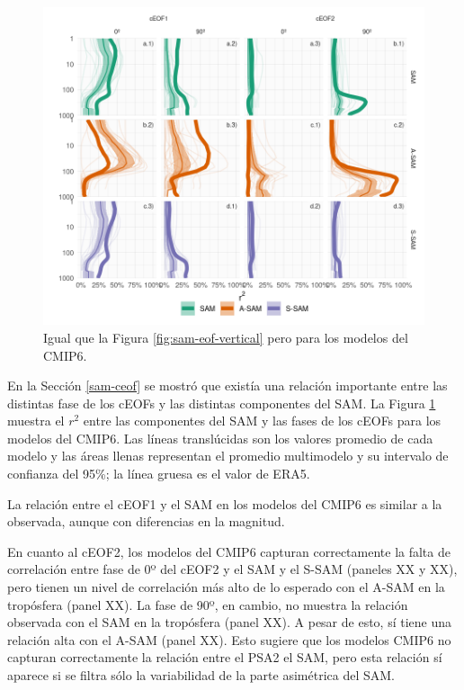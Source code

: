 \documentclass[12pt,oneside,a4paper]{reedthesis}
\begin{document}
\begin{figure}

{\centering \includegraphics{figures/50-cmip6/cor-sam-cmip6-1} 

}

\caption{Igual que la Figura \ref{fig:sam-eof-vertical} pero para los modelos del CMIP6.}\label{fig:cor-sam-cmip6}
\end{figure}



En la Sección \ref{sam-ceof} se mostró que existía una relación importante entre las distintas fase de los cEOFs y las distintas componentes del SAM.
La Figura \ref{fig:cor-sam-cmip6} muestra el \(r^2\) entre las componentes del SAM y las fases de los cEOFs para los modelos del CMIP6.
Las líneas translúcidas son los valores promedio de cada modelo y las áreas llenas representan el promedio multimodelo y su intervalo de confianza del 95\%; la línea gruesa es el valor de ERA5.

La relación entre el cEOF1 y el SAM en los modelos del CMIP6 es similar a la observada, aunque con diferencias en la magnitud.

En cuanto al cEOF2, los modelos del CMIP6 capturan correctamente la falta de correlación entre fase de 0º del cEOF2 y el SAM y el S-SAM (paneles XX y XX), pero tienen un nivel de correlación más alto de lo esperado con el A-SAM en la tropósfera (panel XX).
La fase de 90º, en cambio, no muestra la relación observada con el SAM en la tropósfera (panel XX).
A pesar de esto, sí tiene una relación alta con el A-SAM (panel XX).
Esto sugiere que los modelos CMIP6 no capturan correctamente la relación entre el PSA2 el SAM, pero esta relación sí aparece si se filtra sólo la variabilidad de la parte asimétrica del SAM.
\end{document}
